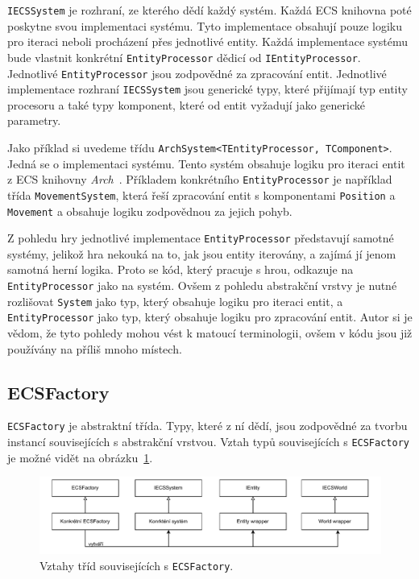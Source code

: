 \texttt{IECSSystem} je rozhraní, ze kterého dědí každý systém. Každá ECS knihovna poté poskytne svou implementaci systému. Tyto implementace obsahují pouze logiku pro iteraci neboli procházení přes jednotlivé entity. Každá implementace systému bude vlastnit konkrétní \texttt{EntityProcessor} dědicí od \texttt{IEntityProcessor}. Jednotlivé \texttt{EntityProcessor} jsou zodpovědné za zpracování entit. Jednotlivé implementace rozhraní \texttt{IECSSystem} jsou generické typy, které přijímají typ entity procesoru a také typy komponent, které od entit vyžadují jako generické parametry.

Jako příklad si uvedeme třídu \texttt{ArchSystem<TEntityProcessor, TComponent>}. Jedná se o implementaci systému. Tento systém obsahuje logiku pro iteraci entit z ECS knihovny \textit{Arch}~\cite{Arch}. Příkladem konkrétního \texttt{EntityProcessor} je například třída \texttt{MovementSystem}, která řeší zpracování entit s komponentami \texttt{Position} a \texttt{Movement} a obsahuje logiku zodpovědnou za jejich pohyb.

Z pohledu hry jednotlivé implementace \texttt{EntityProcessor} představují samotné systémy, jelikož hra nekouká na to, jak jsou entity iterovány, a zajímá jí jenom samotná herní logika. Proto se kód, který pracuje s hrou, odkazuje na \texttt{EntityProcessor} jako na systém. Ovšem z pohledu abstrakční vrstvy je nutné rozlišovat \texttt{System} jako typ, který obsahuje logiku pro iteraci entit, a \texttt{EntityProcessor} jako typ, který obsahuje logiku pro zpracování entit. Autor si je vědom, že tyto pohledy mohou vést k matoucí terminologii, ovšem v kódu jsou již používány na příliš mnoho místech.

\subsection{ECSFactory}
\texttt{ECSFactory} je abstraktní třída. Typy, které z ní dědí, jsou zodpovědné za tvorbu instancí souvisejících s abstrakční vrstvou. Vztah typů souvisejících s \texttt{ECSFactory} je možné vidět na obrázku~\ref{fig:abstract-layer-ecsfactory}.

\begin{figure}[!htb]
  \centering
  \includegraphics[width=1.0\linewidth]{img/abstract-layer-ecsfactory.pdf}
  \caption{Vztahy tříd souvisejících s \texttt{ECSFactory}.}
  \label{fig:abstract-layer-ecsfactory}
\end{figure}

